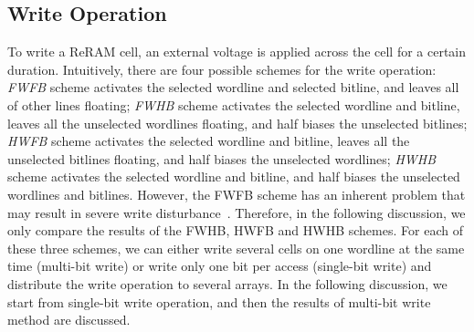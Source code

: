 \subsection{Write Operation}
To write a ReRAM cell, an external voltage is applied across the cell for
a certain duration. Intuitively, there are four possible schemes for the
write operation: \emph{FWFB} scheme activates the selected wordline and
selected bitline, and leaves all of other lines floating; \emph{FWHB}
scheme activates the selected wordline and bitline, leaves all the
unselected wordlines floating, and half biases the unselected bitlines;
\emph{HWFB} scheme activates the selected wordline and bitline, leaves all
the unselected bitlines floating, and half biases the unselected
wordlines; \emph{HWHB} scheme activates the selected wordline and bitline,
and half biases the unselected wordlines and bitlines. However, the FWFB
scheme has an inherent problem that may result in severe write
disturbance~\cite{crossbar_NANO2003_Ziegler}. Therefore, in the following
discussion, we only compare the results of the FWHB, HWFB and HWHB
schemes. For each of these three schemes, we can either write several
cells on one wordline at the same time (multi-bit write) or write only one
bit per access (single-bit write) and distribute the write operation to
several arrays. In the following discussion, we start from single-bit
write operation, and then the results of multi-bit write method are
discussed.

